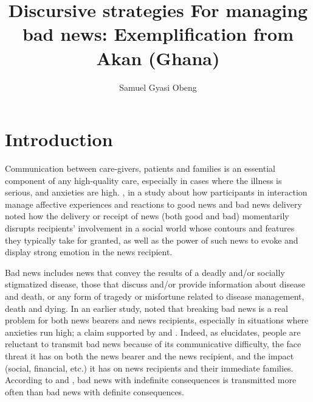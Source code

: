 \documentclass[output=paper,colorlinks,citecolor=brown]{langscibook}
\author{Samuel Gyasi Obeng
\affiliation{Indiana University}}
\title{Discursive strategies For managing bad news: Exemplification from Akan (Ghana)
}
\begin{document}
\maketitle

\section{Introduction}\label{sec:obeng:1}

Communication between care-givers, patients and families is an essential component of any high-quality care, especially in cases where the illness is serious, and anxieties are high. \citet{MaynardFreese2012}, in a study about how participants in interaction manage affective experiences and reactions to good news and bad news delivery noted how the delivery or receipt of news (both good and bad) momentarily disrupts recipients’ involvement in a social world whose contours and features they typically take for granted, as well as the power of such news to evoke and display strong emotion in the news recipient. 

Bad news includes news that convey the results of a deadly and/or socially stigmatized disease, those that discuss and/or provide information about disease and death, or any form of tragedy or misfortune related to disease management, death and dying. In an earlier study, \citet{Maynard2003} noted that breaking bad news is a real problem for both news bearers and news recipients, especially in situations where anxieties run high; a claim supported by \citet{FallowfieldJenkins2004} and \citet{BrownEtAl2009}. Indeed, as \citet{Maynard2003} elucidates, people are reluctant to transmit bad news because of its communicative difficulty, the face threat it has on both the news bearer and the news recipient, and the impact (social, financial, etc.) it has on news recipients and their immediate families. According to \citet{TesserRosen1975} and \citet{WeenigEtAl2014, WeenigEtAl2001}, bad news with indefinite consequences is transmitted more often than bad news with definite consequences.
\end{document}
